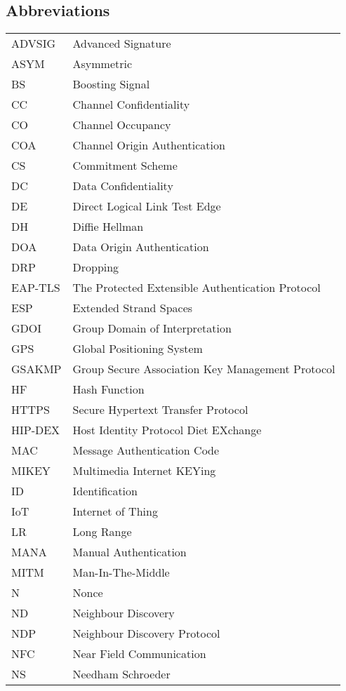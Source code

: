 \subsection*{Abbreviations}

\begin{longtable}[l]{p{50pt} p{270pt}} 
ADVSIG & Advanced Signature \\
ASYM & Asymmetric \\
BS & Boosting Signal \\
CC & Channel Confidentiality  \\
CO & Channel Occupancy  \\
COA & Channel Origin Authentication  \\
CS & Commitment Scheme \\
DC & Data Confidentiality  \\
DE & Direct Logical Link Test Edge \\
DH &  Diffie Hellman \\
DOA & Data Origin Authentication \\ 
DRP & Dropping \\
EAP-TLS & The Protected Extensible Authentication Protocol \\
ESP & Extended Strand Spaces \\
GDOI & Group Domain of Interpretation \\
GPS & Global Positioning System\\
GSAKMP & Group Secure Association Key Management Protocol \\
HF & Hash Function \\
HTTPS & Secure Hypertext Transfer Protocol \\
HIP-DEX & Host Identity Protocol Diet EXchange \\
MAC &  Message Authentication Code \\
MIKEY & Multimedia Internet KEYing \\
ID & Identification \\
IoT & Internet of Thing \\
LR & Long Range \\
MANA & Manual Authentication \\
MITM & Man-In-The-Middle \\
N & Nonce \\
ND & Neighbour Discovery \\
NDP & Neighbour Discovery Protocol \\
NFC & Near Field Communication \\
NS & Needham Schroeder\\

\end{longtable}
